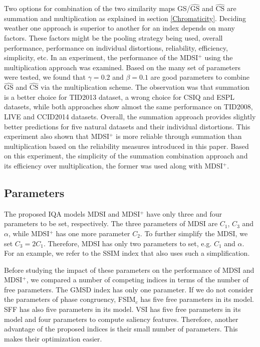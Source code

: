 Two options for combination of the two similarity maps GS/$\widehat{\text{GS}}$ and $\widehat{\text{CS}}$ are summation and multiplication as explained in section \ref{Chromaticity}. Deciding weather one approach is superior to another for an index depends on many factors. These factors might be the pooling strategy being used, overall performance, performance on individual distortions, reliability, efficiency, simplicity, etc. In an experiment, the performance of the MDSI$^+$ using the multiplication approach was examined. Based on the many set of parameters were tested, we found that $\gamma = 0.2$ and $\beta = 0.1$ are good parameters to combine $\widehat{\text{GS}}$ and $\widehat{\text{CS}}$ via the multiplication scheme. The observation was that summation is a better choice for TID2013 dataset, a wrong choice for CSIQ and ESPL datasets, while both approaches show almost the same performance on TID2008, LIVE and CCID2014 datasets. Overall, the summation approach provides slightly better predictions for five natural datasets and their individual distortions. This experiment also shown that MDSI$^+$ is more reliable through summation than multiplication based on the reliability measures introduced in this paper. Based on this experiment, the simplicity of the summation combination approach and its efficiency over multiplication, the former was used along with MDSI$^+$.






\subsection{Parameters}
\label{parameters}

The proposed IQA models MDSI and MDSI$^+$ have only three and four parameters to be set, respectively. The three parameters of MDSI are $C_1$, $C_3$ and $\alpha$, while MDSI$^+$ has one more parameter $C_2$. To further simplify the MDSI, we set $C_3 = 2C_1$. Therefore, MDSI has only two parameters to set, e.g. $C_1$ and $\alpha$. For an example, we refer to the SSIM index \cite{SSIM} that also uses such a simplification. 

Before studying the impact of these parameters on the performance of MDSI and MDSI$^+$, we compared a number of competing indices in terms of the number of free parameters. The GMSD index has only one parameter. If we do not consider the parameters of phase congruency, FSIM$_c$ has five free parameters in its model. SFF has also five parameters in its model. VSI has five free parameters in its model and four parameters to compute saliency features. Therefore, another advantage of the proposed indices is their small number of parameters. This makes their optimization easier. 

